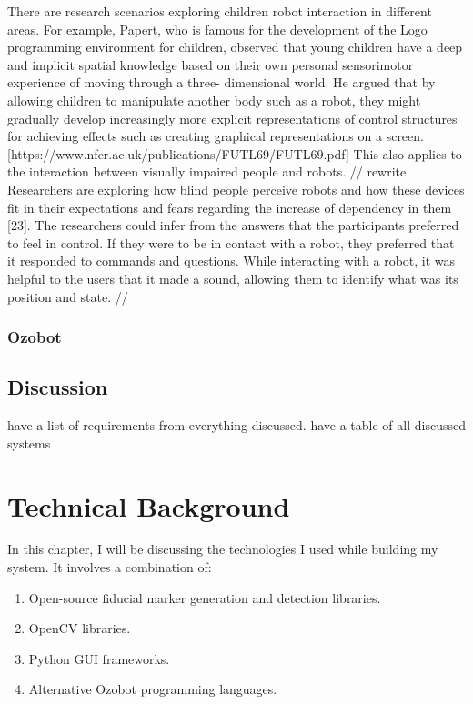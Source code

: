 \documentclass[oneside,%
                    author={Malak Hajji},
                    degree={BSc},
                    title={Designing An Accessible Computational Toolkit For Students},
                  subtitle={With Mixed Visual Abilities}]{dissertation}
\begin{document}
There are research scenarios exploring children robot interaction in different areas. For example, Papert, who is famous for the development of the Logo programming environment for children, observed that young children have a deep and implicit spatial knowledge based on their own personal sensorimotor experience of moving through a three- dimensional world. He argued that by allowing children to manipulate another body such as a robot, they might gradually develop increasingly more explicit representations of control structures for achieving effects such as creating graphical representations on a screen. [https://www.nfer.ac.uk/publications/FUTL69/FUTL69.pdf] This also applies to the interaction between visually impaired people and robots. 
// rewrite Researchers are exploring how blind people perceive robots and how these devices fit in their expectations and fears regarding the increase of dependency in them [23]. The researchers could infer from the answers that the participants preferred to feel in control. If they were to be in contact with a robot, they preferred that it responded to commands and questions. While interacting with a robot, it was helpful to the users that it made a sound, allowing them to identify what was its position and state. // 

\subsection{Ozobot}



\section{Discussion} 
have a list of requirements from everything discussed.
have a table of all discussed systems 





\chapter{Technical Background}
\label{chap:evaluation}



\noindent
In this chapter, I will be discussing the technologies I used while building my system. It involves a combination of:

\begin{enumerate}
\item Open-source fiducial marker generation and detection libraries.
\item OpenCV libraries.
\item Python GUI frameworks. 
\item Alternative Ozobot programming languages.
\end{enumerate}
\end{document}

